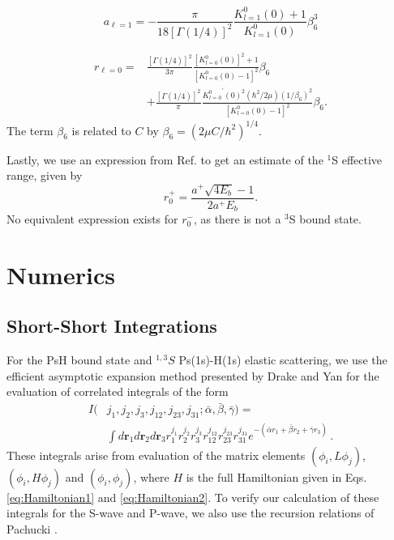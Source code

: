 \documentclass[preprint,showpacs,preprintnumbers,amsmath,amssymb,longbibliography,pra,aps]{revtex4-1}
\newcommand{\todoi}{\todo[inline]}
\begin{document}
\begin{equation}
\label{eq:GaoScatLenP}
a_{\ell=1} = -\frac{\pi}{18[\Gamma(1/4)]^2} \frac{K_{l=1}^0(0) + 1}{K_{l=1}^0(0)} \beta_6^3
\end{equation}

\begin{align}
\label{eq:GaoEffRange}
r_{\ell=0} = &\frac{[\Gamma(1/4)]^2}{3\pi} \frac{[K_{l=0}^0(0)]^2 + 1}{[K_{l=0}^0(0) - 1]^2} \beta_6 \nonumber \\
&+ \frac{[\Gamma(1/4)]^2}{\pi} \frac{{K_{l=0}^0}^\prime(0)^2(\hbar^2/2\mu)(1/\beta_6)^2}{[K_{l=0}^0(0) - 1]^2} \beta_6.
\end{align}
The term $\beta_6$ is related to $C$ by $\beta_6 = (2\mu C/\hbar^2)^{1/4}$.

Lastly, we use an expression from Ref. \cite{Blackwood2002} to get an estimate of the $^1$S effective range, given by
\begin{equation}
\label{eq:BlackwoodERT}
r_0^+ = \frac{a^+ \sqrt{4 E_b} - 1}{2 a^+ E_b}.
\end{equation}
No equivalent expression exists for $r_0^-$, as there is not a $^3$S bound state.


\section{Numerics}
\label{sec:Numerical}

\subsection{Short-Short Integrations}
\label{sec:ShortInt}
For the PsH bound state and $^{1,3}S$ Ps(1s)-H(1s) elastic scattering, we use the efficient asymptotic expansion method presented by Drake and Yan \cite{Drake1995} for the evaluation of correlated integrals of the form
\begin{align}
\label{eq:ShortInt}
I(&j_1,j_2,j_3,j_{12},j_{23},j_{31}; \bar{\alpha}, \bar{\beta}, \bar{\gamma}) =  \nonumber \\
&\int
d \textbf{r}_1 d \textbf{r}_2 d \textbf{r}_3
r_1^{j_1} r_2^{j_2} r_3^{j_3} r_{12}^{j_{12}}
r_{23}^{j_{23}} r_{31}^{j_{31}}
e^{-(\bar{\alpha} r_1 + \bar{\beta} r_2 + \bar{\gamma} r_3)}\, .
\end{align}
These integrals arise from evaluation of the matrix elements $(\phi_i, L \phi_j)$, $(\phi_i, H \phi_j)$ and $(\phi_i, \phi_j)$, where $H$ is the full Hamiltonian given in Eqs. \ref{eq:Hamiltonian1} and \ref{eq:Hamiltonian2}. To verify our calculation of these integrals for the S-wave and P-wave, we also use the recursion relations of Pachucki \cite{Pachucki2004}.
\end{document}
